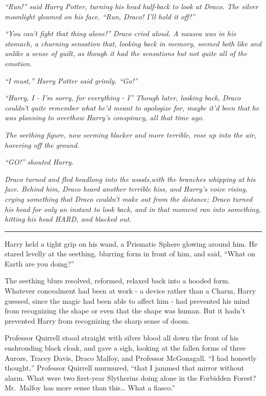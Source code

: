 \emph{``Run!'' said Harry Potter, turning his head half-back to look at
Draco. The silver moonlight gleamed on his face. ``Run, Draco! I'll hold
it off!''}

\emph{``You can't fight that thing alone!'' Draco cried aloud. A nausea
was in his stomach, a churning sensation that, looking back in memory,
seemed both like and unlike a sense of guilt, as though it had the
sensations but not quite all of the emotion.}

\emph{``I must,'' Harry Potter said grimly. ``Go!''}

\emph{``Harry, I - I'm sorry, for everything - I'' Though later, looking
back, Draco couldn't quite remember what he'd meant to apologize for,
maybe it'd been that he was planning to overthow Harry's conspiracy, all
that time ago.}

\emph{The seething figure, now seeming blacker and more terrible, rose
up into the air, hovering off the ground.}

\emph{``GO!'' shouted Harry.}

\emph{Draco turned and fled headlong into the woods,with the branches
whipping at his face. Behind him, Draco heard another terrible hiss, and
Harry's voice rising, crying something that Draco couldn't make out from
the distance; Draco turned his head for only an instant to look back,
and in that moment ran into something, hitting his head HARD, and
blacked out.}

\begin{center}\rule{3in}{0.4pt}\end{center}

Harry held a tight grip on his wand, a Prismatic Sphere glowing around
him. He stared levelly at the seething, blurring form in front of him,
and said, ``What on Earth are you doing?''

The seething blurs resolved, reformed, relaxed back into a hooded form.
Whatever concealment had been at work - a device rather than a Charm,
Harry guessed, since the magic had been able to affect him - had
prevented his mind from recognizing the shape or even that the shape was
human. But it hadn't prevented Harry from recognizing the sharp sense of
doom.

Professor Quirrell stood straight with silver blood all down the front
of his enshrouding black cloak, and gave a sigh, looking at the fallen
forms of three Aurors, Tracey Davis, Draco Malfoy, and Professor
McGonagall. ``I had honestly thought,'' Professor Quirrell murmured,
``that I jammed that mirror without alarm. What were two first-year
Slytherins doing alone in the Forbidden Forest? Mr.~Malfoy has more
sense than this\ldots{} What a fiasco.''

